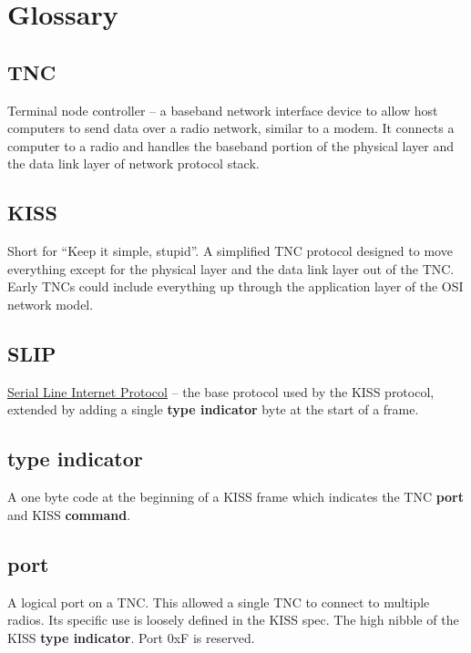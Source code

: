 \documentclass[a4paper,11pt,oneside]{book}
\begin{document}
\section{Glossary}

\subsection{TNC}

Terminal node controller -- a baseband network interface device to allow host computers to send data over a radio network, similar to a modem. It connects a computer to a radio and handles the baseband portion of the physical layer and the data link layer of network protocol stack.

\subsection{KISS}

Short for ``Keep it simple, stupid''. A simplified TNC protocol designed to move everything except for the physical layer and the data link layer out of the TNC. Early TNCs could include everything up through the application layer of the OSI network model.

\subsection{SLIP}

\href{https://en.wikipedia.org/wiki/Serial_Line_Internet_Protocol}{Serial Line Internet Protocol} -- the base protocol used by the KISS protocol, extended by adding a single \textbf{type indicator} byte at the start of a frame.

\subsection{type indicator}

A one byte code at the beginning of a KISS frame which indicates the TNC \textbf{port} and KISS \textbf{command}.

\subsection{port}

A logical port on a TNC. This allowed a single TNC to connect to multiple radios. Its specific use is loosely defined in the KISS spec. The high nibble of the KISS \textbf{type indicator}. Port 0xF is reserved.
\end{document}
